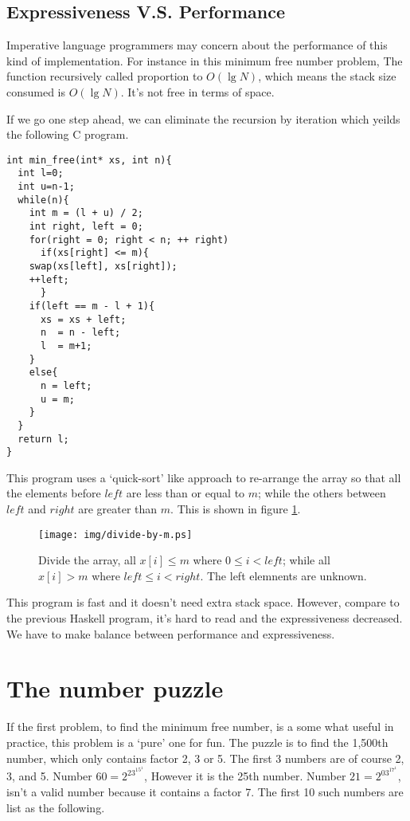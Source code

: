 \documentclass{article}
\begin{document}
\subsection{Expressiveness V.S. Performance}
Imperative language programmers may concern about the performance
of this kind of implementation. For instance in this minimum
free number problem, The function recursively called proportion
to $O(\lg N)$, which means the stack size consumed is $O(\lg N)$.
It's not free in terms of space.

If we go one step ahead, we can eliminate the recursion by
iteration which yeilds the following C program.

\lstset{language=C}
\begin{lstlisting}
int min_free(int* xs, int n){
  int l=0;
  int u=n-1;
  while(n){
    int m = (l + u) / 2;
    int right, left = 0;
    for(right = 0; right < n; ++ right)
      if(xs[right] <= m){
	swap(xs[left], xs[right]);
	++left;
      }
    if(left == m - l + 1){
      xs = xs + left;
      n  = n - left;
      l  = m+1;
    }
    else{
      n = left;
      u = m;
    }
  }
  return l;
}
\end{lstlisting}

This program uses a `quick-sort' like approach to re-arrange the 
array so that all the elements before $left$ are less than or equal
to $m$; while the others between $left$ and $right$ are greater
than $m$. This is shown in figure \ref{fig:divide}.

\begin{figure}[htbp]
       \begin{center}
       	  \texttt{[image: img/divide-by-m.ps]}
        \caption{Divide the array, all $x[i] \leq m$ where $0 \leq i < left$; while all $x[i] > m$ where $left \leq i < right$. The left elemnents are unknown.} \label{fig:divide}
       \end{center}
\end{figure}

This program is fast and it doesn't need extra stack space. However,
compare to the previous Haskell program, it's hard to read and the
expressiveness decreased. We have to make balance between performance
and expressiveness.

\section{The number puzzle}

If the first problem, to find the minimum free number, is a some what
useful in practice, this problem is a `pure' one for fun. The puzzle 
is to find the 1,500th number, which only contains factor 2, 3 or 5.
The first 3 numbers are of course 2, 3, and 5. Number $60 = 2^23^15^1$,
However it is the 25th number. Number $21 = 2^03^17^1$, isn't a valid
number because it contains a factor 7. The first 10 such numbers are list
as the following.
\end{document}
